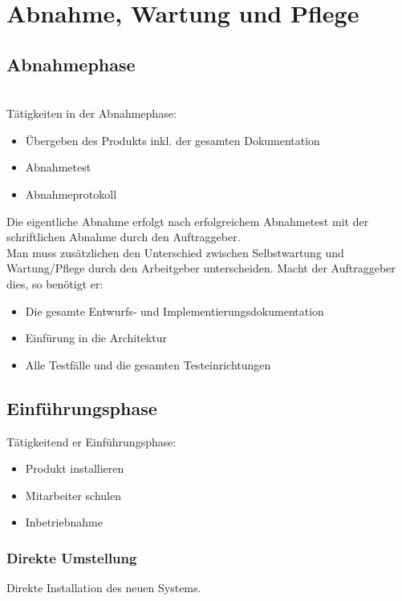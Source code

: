 \section{Abnahme, Wartung und Pflege}
\subsection{Abnahmephase}
\\
Tätigkeiten in der Abnahmephase:
\begin{itemize}
    \item Übergeben des Produkts inkl. der gesamten Dokumentation
    \item Abnahmetest
    \item Abnahmeprotokoll
\end{itemize}

Die eigentliche Abnahme erfolgt nach erfolgreichem Abnahmetest mit der schriftlichen Abnahme durch den Auftraggeber.
\\
Man muss zusätzlichen den Unterschied zwischen Selbstwartung und Wartung/Pflege durch den Arbeitgeber unterscheiden. Macht der Auftraggeber dies, so benötigt er:
\begin{itemize}
    \item Die gesamte Entwurfs- und Implementierungsdokumentation
    \item Einfürung in die Architektur
    \item Alle Testfälle und die gesamten Testeinrichtungen
\end{itemize}

\subsection{Einführungsphase}
Tätigkeitend er Einführungsphase:
\begin{itemize}
    \item Produkt installieren
    \item Mitarbeiter schulen
    \item Inbetriebnahme
\end{itemize}

\subsubsection{Direkte Umstellung}
Direkte Installation des neuen Systems.

